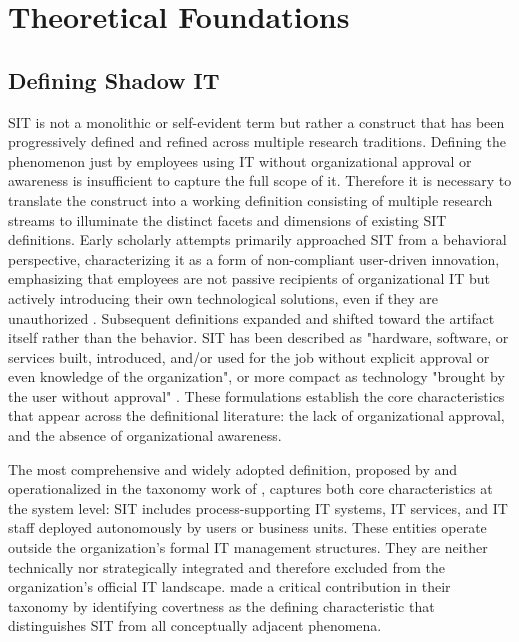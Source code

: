 \documentclass[12pt,oneside]{article}
\begin{document}
\section{Theoretical Foundations} \label{theoretical-foundations}

\subsection{Defining Shadow IT}

\ac{SIT} is not a monolithic or self-evident term but rather a construct that has been progressively defined and refined across multiple research traditions. Defining the phenomenon just by employees using \ac{IT} without organizational approval or awareness is insufficient to capture the full scope of it. Therefore it is necessary to translate the construct into a working definition consisting of multiple research streams to illuminate the distinct facets and dimensions of existing \ac{SIT} definitions.
Early scholarly attempts primarily approached \ac{SIT} from a behavioral perspective, characterizing it as a form of non-compliant user-driven innovation, emphasizing that employees are not passive recipients of organizational \ac{IT} but actively introducing their own technological solutions, even if they are unauthorized \citep[3]{gyoery2012exploring}. Subsequent definitions expanded and shifted toward the artifact itself rather than the behavior. \ac{SIT} has been described as "hardware, software, or services built, introduced, and/or used for the job without explicit approval or even knowledge of the organization", or more compact as technology "brought by the user without approval" \citep[469, 470]{haag2017shadow}. These formulations establish the core characteristics that appear across the definitional literature: the lack of organizational approval, and the absence of organizational awareness.

The most comprehensive and widely adopted definition, proposed by \citet[3]{zimmermann2014emergence} and operationalized in the taxonomy work of \citet[1, 4-5]{kopper2016towards}, captures both core characteristics at the system level: \ac{SIT} includes process-supporting \ac{IT} systems, \ac{IT} services, and \ac{IT} staff deployed autonomously by users or business units. These entities operate outside the organization's formal \ac{IT} management structures. They are neither technically nor strategically integrated and therefore excluded from the organization's official \ac{IT} landscape. \citet[4]{kaess2021towards} made a critical contribution in their taxonomy by identifying covertness as the defining characteristic that distinguishes \ac{SIT} from all conceptually adjacent phenomena.
 
\end{document}
